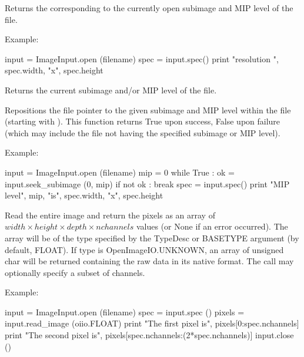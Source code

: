 Returns the \ImageSpec corresponding to the currently open subimage and
MIP level of the file.

\noindent Example:
\begin{code}
    input = ImageInput.open (filename)
    spec = input.spec()
    print "resolution ", spec.width, "x", spec.height
\end{code}
\apiend

Returns the current subimage and/or MIP level of the file.
\apiend

Repositions the file pointer to the given subimage and MIP level within the
file (starting with {}).  This function returns {\cf True} upon success,
{\cf False} upon failure (which may include the file not having the
specified subimage or MIP level).

\noindent Example:
\begin{code}
    input = ImageInput.open (filename)
    mip = 0
    while True :
        ok = input.seek_subimage (0, mip)
        if not ok :
            break
        spec = input.spec()
        print "MIP level", mip, "is", spec.width, "x", spec.height
\end{code}
\apiend

Read the entire image and return the pixels as an array of
$\mathit{width} \times \mathit{height} \times \mathit{depth} \times \mathit{nchannels}$
values (or {\cf None} if an error occurred). The array will be of the type
specified by the {\cf TypeDesc} or {\cf BASETYPE} argument (by default,
{\cf FLOAT}). If {\cf type} is {\cf OpenImageIO.UNKNOWN}, an
array of {\cf unsigned char} will be returned containing the raw data in
its native format. The call may optionally specify a subset of channels.

\noindent Example:
\begin{code}
    input = ImageInput.open (filename)
    spec = input.spec ()
    pixels = input.read_image (oiio.FLOAT)
    print "The first pixel is", pixels[0:spec.nchannels]
    print "The second pixel is", pixels[spec.nchannels:(2*spec.nchannels)]
    input.close ()
\end{code}
\apiend

